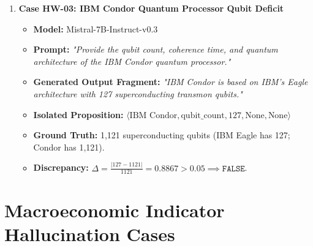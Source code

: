\begin{enumerate}
    \item \textbf{Case HW-03: IBM Condor Quantum Processor Qubit Deficit}
    \begin{itemize}
        \item \textbf{Model:} Mistral-7B-Instruct-v0.3
        \item \textbf{Prompt:} \textit{"Provide the qubit count, coherence time, and quantum architecture of the IBM Condor quantum processor."}
        \item \textbf{Generated Output Fragment:} \textit{"IBM Condor is based on IBM's Eagle architecture with 127 superconducting transmon qubits."}
        \item \textbf{Isolated Proposition:} $\langle \text{IBM Condor}, \text{qubit\_count}, 127, \text{None}, \text{None} \rangle$
        \item \textbf{Ground Truth:} 1,121 superconducting qubits (IBM Eagle has 127; Condor has 1,121).
        \item \textbf{Discrepancy:} $\Delta = \frac{|127 - 1121|}{1121} = 0.8867 > 0.05 \implies \texttt{FALSE}$.
    \end{itemize}
\end{enumerate}

\section{Macroeconomic Indicator Hallucination Cases}
\label{sec:app_macro_cases}


